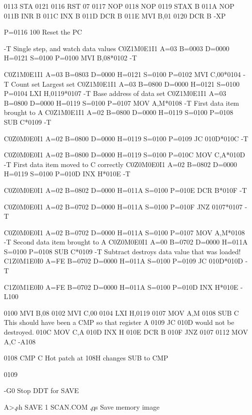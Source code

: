  0113   STA        0121
 0116   RST        07
 0117   NOP
 0118   NOP
 0119   STAX       B
 011A   NOP
 011B   INR        B
 011C   INX        B
 011D   DCR        B
 011E   MVI        B,01
 0120   DCR        B
-XP

P=0116 100   Reset the PC

-T
    Single step, and watch data values
C0Z1M0E1I1 A=03 B=0003 D=0000 H=0121 S=0100 P=0100 MVI B,08*0102
-T

C0Z1M0E1I1 A=03 B=0803 D=0000 H=0121 S=0100 P=0102 MVI C,00*0104
-T
         Count set     Largest set
C0Z1M0E1I1 A=03 B=0800 D=0000 H=0121 S=0100 P=0104 LXI H,0119*0107
-T
                                    Base address of data set
C0Z1M0E1I1 A=03 B=0800 D=0000 H=0119 S=0100 P=0107 MOV A,M*0108
-T
                 First data item brought to A
C0Z1M0E1I1 A=02 B=0800 D=0000 H=0119 S=0100 P=0108 SUB C*0109
-T

C0Z0M0E0I1 A=02 B=0800 D=0000 H=0119 S=0100 P=0109 JC 010D*010C
-T

C0Z0M0E0I1 A=02 B=0800 D=0000 H=0119 S=0100 P=010C MOV C,A*010D
-T
                       First data item moved to C correctly
C0Z0M0E0I1 A=02 B=0802 D=0000 H=0119 S=0100 P=010D INX H*010E
-T

C0Z0M0E0I1 A=02 B=0802 D=0000 H=011A S=0100 P=010E DCR B*010F
-T

C0Z0M0E0I1 A=02 B=0702 D=0000 H=011A S=0100 P=010F JNZ 0107*0107
-T

C0Z0M0E0I1 A=02 B=0702 D=0000 H=011A S=0100 P=0107 MOV A,M*0108
-T
                 Second data item brought to A
C0Z0M0E0I1 A=00 B=0702 D=0000 H=011A S=0100 P=0108 SUB C*0109
-T
                 Subtract destroys data value that was loaded!
C1Z0M1E0I0 A=FE B=0702 D=0000 H=011A S=0100 P=0109 JC 010D*010D
-T

C1Z0M1E0I0 A=FE B=0702 D=0000 H=011A S=0100 P=010D INX H*010E
-L100

 0100   MVI        B,08
 0102   MVI        C,00
 0104   LXI        H,0119
 0107   MOV        A,M
 0108   SUB        C       This should have been a CMP so that register A
 0109   JC         010D    would not be destroyed.
 010C   MOV        C,A
 010D   INX        H
 010E   DCR        B
 010F   JNZ        0107
 0112   MOV        A,C
 -A108

0108 CMP C    Hot patch at 108H changes SUB to CMP

0109

-G0   Stop DDT for SAVE

A>\c
.sh
SAVE 1 SCAN.COM    \c
.qs
Save memory image

